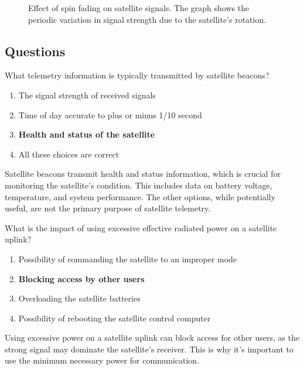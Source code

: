 \begin{figure}[h!]
    \centering
    \caption{Effect of spin fading on satellite signals. The graph shows the periodic variation in signal strength due to the satellite's rotation.}
    \label{fig:spin_fading}
\end{figure}

\subsection*{Questions}
\begin{tcolorbox}[colback=gray!10!white,colframe=black!75!black,title={T8B01}]
    What telemetry information is typically transmitted by satellite beacons?
    \begin{enumerate}[label=\Alph*),noitemsep]
        \item The signal strength of received signals
        \item Time of day accurate to plus or minus 1/10 second
        \item \textbf{Health and status of the satellite}
        \item All these choices are correct
    \end{enumerate}
\end{tcolorbox}
Satellite beacons transmit health and status information, which is crucial for monitoring the satellite's condition. This includes data on battery voltage, temperature, and system performance. The other options, while potentially useful, are not the primary purpose of satellite telemetry.


\begin{tcolorbox}[colback=gray!10!white,colframe=black!75!black,title={T8B02}]
    What is the impact of using excessive effective radiated power on a satellite uplink?
    \begin{enumerate}[label=\Alph*),noitemsep]
        \item Possibility of commanding the satellite to an improper mode
        \item \textbf{Blocking access by other users}
        \item Overloading the satellite batteries
        \item Possibility of rebooting the satellite control computer
    \end{enumerate}
\end{tcolorbox}
Using excessive power on a satellite uplink can block access for other users, as the strong signal may dominate the satellite's receiver. This is why it's important to use the minimum necessary power for communication.

